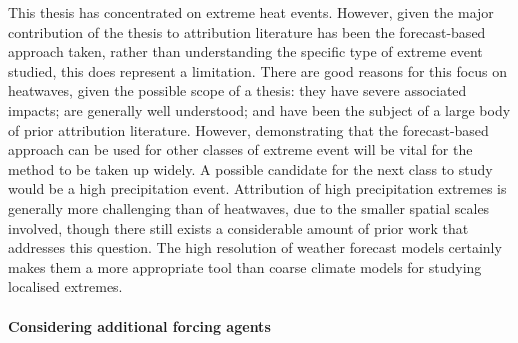     This thesis has concentrated on extreme heat events. However, given the major contribution of the thesis to attribution literature has been the forecast-based approach taken, rather than understanding the specific type of extreme event studied, this does represent a limitation. There are good reasons for this focus on heatwaves, given the possible scope of a thesis: they have severe associated impacts; are generally well understood; and have been the subject of a large body of prior attribution literature. However, demonstrating that the forecast-based approach can be used for other classes of extreme event will be vital for the method to be taken up widely. A possible candidate for the next class to study would be a high precipitation event. Attribution of high precipitation extremes is generally more challenging than of heatwaves, due to the smaller spatial scales involved, though there still exists a considerable amount of prior work that addresses this question. The high resolution of weather forecast models certainly makes them a more appropriate tool than coarse climate models for studying localised extremes.

  \paragraph*{Considering additional forcing agents}

